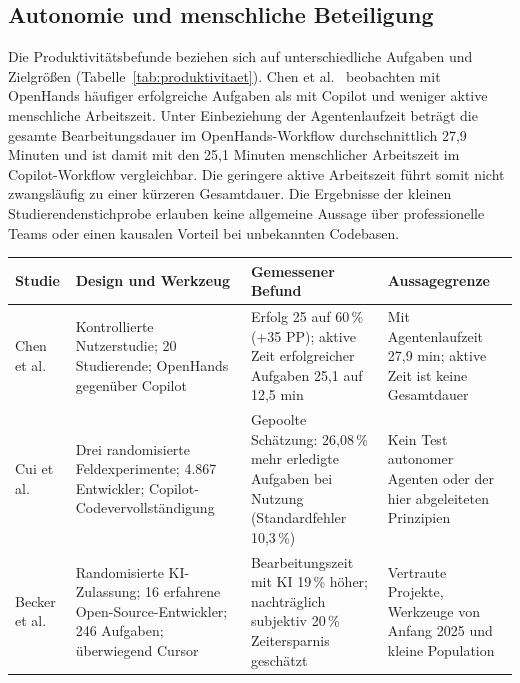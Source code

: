 \documentclass[conference]{IEEEtran}
\begin{document}
\subsection{Autonomie und menschliche Beteiligung}
Die Produktivitätsbefunde beziehen sich auf unterschiedliche Aufgaben und Zielgrößen (Tabelle~\ref{tab:produktivitaet}). Chen et al.~\cite{chen2025codewithme} beobachten mit OpenHands häufiger erfolgreiche Aufgaben als mit Copilot und weniger aktive menschliche Arbeitszeit. Unter Einbeziehung der Agentenlaufzeit beträgt die gesamte Bearbeitungsdauer im OpenHands-Workflow durchschnittlich 27,9 Minuten und ist damit mit den 25,1 Minuten menschlicher Arbeitszeit im Copilot-Workflow vergleichbar. Die geringere aktive Arbeitszeit führt somit nicht zwangsläufig zu einer kürzeren Gesamtdauer. Die Ergebnisse der kleinen Studierendenstichprobe erlauben keine allgemeine Aussage über professionelle Teams oder einen kausalen Vorteil bei unbekannten Codebasen.
\clearpage
\begin{strip}
\label{tab:produktivitaet}
\centering
\small
\setlength{\tabcolsep}{4pt}
\begin{tabular}{@{}L{0.13\textwidth}L{0.27\textwidth}L{0.31\textwidth}L{0.23\textwidth}@{}}
\hline
\textbf{Studie} & \textbf{Design und Werkzeug} & \textbf{Gemessener Befund} & \textbf{Aussagegrenze}\\
\hline
Chen et al.~\cite{chen2025codewithme} & Kontrollierte Nutzerstudie; 20 Studierende; OpenHands gegenüber Copilot & Erfolg 25 auf 60\,\% (+35 PP); aktive Zeit erfolgreicher Aufgaben 25,1 auf 12,5 min & Mit Agentenlaufzeit 27,9 min; aktive Zeit ist keine Gesamtdauer\\[3pt]
Cui et al.~\cite{cui2025genai} & Drei randomisierte Feldexperimente; 4.867 Entwickler; Copilot-Codevervollständigung & Gepoolte Schätzung: 26,08\,\% mehr erledigte Aufgaben bei Nutzung (Standardfehler 10,3\,\%) & Kein Test autonomer Agenten oder der hier abgeleiteten Prinzipien\\[3pt]
Becker et al.~\cite{becker2025metr} & Randomisierte KI-Zulassung; 16 erfahrene Open-Source-Entwickler; 246 Aufgaben; überwiegend Cursor & Bearbeitungszeit mit KI 19\,\% höher; nachträglich subjektiv 20\,\% Zeitersparnis geschätzt & Vertraute Projekte, Werkzeuge von Anfang 2025 und kleine Population\\
\hline
\end{tabular}
\end{strip}
\end{document}
